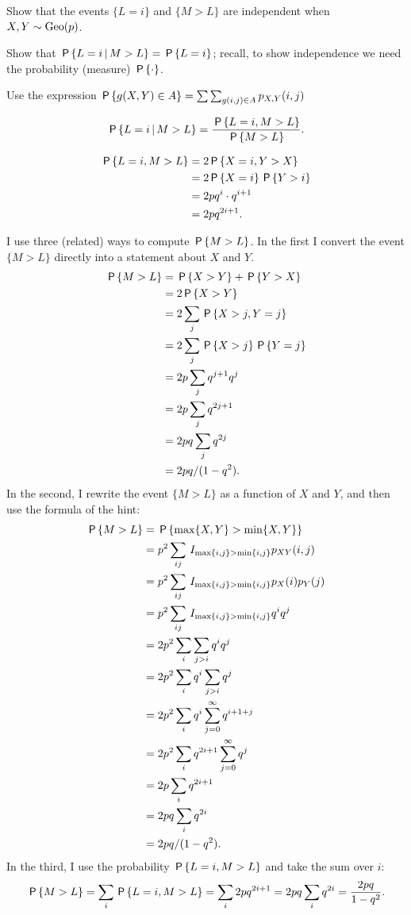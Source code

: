\documentclass[a4paper,11pt]{article}
\begin{document}
\begin{exercise}\label{ex:10}
Show that the events $\{L=i\}$ and $\{M>L\}$ are independent when $X,Y \sim \Geo{p}$.
\begin{hint}
Show that $\P{L=i \given M>L} = \P{L=i}$; recall, to show independence we need the probability (measure) $\P{\cdot}$.

Use the expression $\P{g(X,Y)\in A} = \mathop{\sum\sum}_{g(i, j) \in A} p_{X,Y}(i,j)$
\end{hint}
\begin{solution}
\begin{align}
    \label{eq:1}
\P{L=i\given M > L} 
=\frac{\P{L=i, M > L}}{\P{M>L}}.
\end{align}

\begin{align}
\P{L=i,  M > L} 
&= 2\P{X=i,Y > X} \\
&= 2\P{X=i}\P{Y > i} \\
&= 2pq^i\cdot q^{i+1}\\
&= 2p q^{2i+1}.
\end{align}

I use three (related) ways to compute $\P{M>L}$. In the first I convert the event $\{M>L\}$ directly into a statement about $X$ and $Y$.
\begin{align}
  \label{eq:3}
\P{M>L} 
&= \P{X>Y} + \P{Y > X} \\
&= 2\P{X>Y} \\
&= 2\sum_{j} \P{X>j,Y=j} \\
&= 2\sum_{j}  \P{X>j}\P{Y=j} \\
&= 2p\sum_{j} q^{j+1} q^j\\
&= 2p\sum_{j} q^{2j+1}\\
&= 2pq\sum_{j} q^{2j}\\
&= 2pq/(1-q^2).
\end{align}
In the second,  I rewrite the event $\{M>L\}$ as a function of $X$ and $Y$, and then use  the formula of the hint:
\begin{align}
  \label{eq:4}
\P{M>L}  &= \P{\max{X, Y} > \min{X,Y}} \\
&=p^2\sum_{ij}\1{\max{i, j} > \min{i, j}} p_{XY}(i,j) \\
&=p^2\sum_{ij}\1{\max{i, j} > \min{i, j}} p_{X}(i)p_{Y}(j) \\
&=p^2\sum_{ij}\1{\max{i, j} > \min{i, j}} q^i q^j \\
&=2p^2\sum_{i}\sum_{j>i} q^i q^j \\
&=2p^2\sum_{i}q^i \sum_{j>i} q^j \\
&=2p^2\sum_{i}q^i \sum_{j=0}^\infty q^{i+1+j} \\
&=2p^2\sum_{i}q^{2i+1} \sum_{j=0}^\infty q^{j} \\
&=2p\sum_{i}q^{2i+1} \\
&=2pq\sum_{i}q^{2i} \\
&=2pq/(1-q^2).
\end{align}
In the third, I use the probability $\P{L=i, M>L}$ and take the sum over $i$:
\begin{align}
  \label{eq:48}
\P{M>L} = \sum_{i} \P{L=i, M>L}  = \sum_{i} 2pq^{2i+1} = 2pq\sum_{i} q^{2i} = \frac{2pq}{1-q^{2}}.
\end{align}


\end{solution}
\end{exercise}
\end{document}

